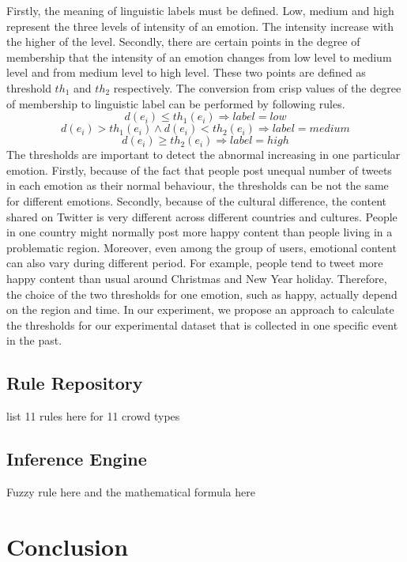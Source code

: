 Firstly, the meaning of linguistic labels must be defined. Low, medium and high represent the three levels of intensity of an emotion. The intensity increase with the higher of the level. Secondly, there are certain points in the degree of membership that the intensity of an emotion changes from low level to medium level and from medium level to high level. These two points are defined as threshold \(th_1\) and \(th_2\) respectively. The conversion from crisp values of the degree of membership to linguistic label can be performed by following rules.
\[
d(e_i) \leq th_1(e_i) \Rightarrow label = low
\]
\[
d(e_i) > th_1(e_i) \land d(e_i) < th_2(e_i) \Rightarrow label = medium
\]
\[
d(e_i) \geq th_2(e_i) \Rightarrow label = high
\]
The thresholds are important to detect the abnormal increasing in one particular emotion. Firstly, because of the fact that people post unequal number of tweets in each emotion as their normal behaviour, the thresholds can be not the same for different emotions. Secondly, because of the cultural difference, the content shared on Twitter is very different across different countries and cultures. People in one country might normally post more happy content than people living in a problematic region. Moreover, even among the group of users, emotional content can also vary during different period. For example, people tend to tweet more happy content than usual around Christmas and New Year holiday. Therefore, the choice of the two thresholds for one emotion, such as happy, actually depend on the region and time. In our experiment, we propose an approach to calculate the thresholds for our experimental dataset that is collected in one specific event in the past.

\subsection{Rule Repository}

list 11 rules here for 11 crowd types

\subsection{Inference Engine}

Fuzzy rule here and the mathematical formula here

\section{Conclusion}